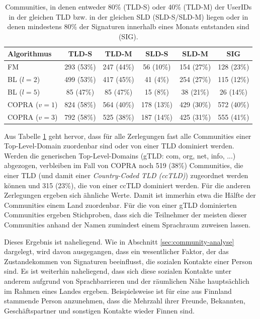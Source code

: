 \begin{table}[t]
  \centering
  \footnotesize
  \begin{tabular}{l|c|c|c|c|c}
    Algorithmus & TLD-S & TLD-M & SLD-S & SLD-M & SIG \\
    \hline
    FM & 293 (53\%) & 247 (44\%) & 56 (10\%) & 154 (27\%) & 128
    (23\%) \\
    \hline
    BL ($l=2$) & 499 (53\%) & 417 (45\%) & 41 (4\%) & 254 (27\%) & 115 (12\%) \\
    BL ($l=5$) & 85 (47\%) & 85 (47\%) & 15 (8\%) & 38 (21\%) & 26 (14\%) \\
    \hline
    COPRA ($v=1$) & 824 (58\%) & 564 (40\%) & 178 (13\%) & 429 (30\%)
    & 572 (40\%) \\
    COPRA ($v=3$) & 792 (58\%) & 525 (38\%) & 187 (14\%) & 425 (31\%) & 555
    (41\%)
  \end{tabular}
  \caption{Communities, in denen entweder 80\% (TLD-S) oder 40\%
    (TLD-M) der UserIDs in der gleichen TLD bzw. in der gleichen SLD
    (SLD-S/SLD-M) liegen oder in denen mindestens 80\% der Signaturen
    innerhalb eines Monats entstanden sind (SIG).}
  \label{tab:assign}
\end{table}

Aus Tabelle \ref{tab:assign} geht hervor, dass für alle Zerlegungen
fast alle Communities einer Top-Level-Domain zuordenbar sind oder von
einer TLD dominiert werden. Werden die generischen Top-Level-Domains
(gTLD: com, org, net, info, ...) abgezogen, verbleiben im Fall von COPRA
noch 519 (38\%) Communities, die einer TLD (und damit einer
\emph{Country-Coded TLD (ccTLD)}) zugeordnet werden können und 315
(23\%), die von einer ccTLD dominiert werden. Für die anderen
Zerlegungen ergeben sich ähnliche Werte. Damit ist immerhin etwa die
Hälfte der Communities einem Land zuordenbar. Für die von einer
gTLD dominierten Communities ergeben Stichproben, dass sich die
Teilnehmer der meisten dieser Communities anhand der Namen zumindest
einem Sprachraum zuweisen lassen.

Dieses Ergebnis ist naheliegend. Wie in Abschnitt
\ref{sec:community-analyse} dargelegt, wird davon ausgegangen, dass
ein wesentlicher Faktor, der das Zustandekommen von Signaturen
beeinflusst, die sozialen Kontakte einer Person sind. Es ist weiterhin
naheliegend, dass sich diese sozialen Kontakte unter anderem aufgrund
von Sprachbarrieren und der räumlichen Nähe hauptsächlich im
Rahmen eines Landes ergeben. Beispielsweise ist für eine aus
Finnland stammende Person anzunehmen, dass die Mehrzahl ihrer Freunde,
Bekannten, Geschäftspartner und sonstigen Kontakte wieder Finnen
sind.

